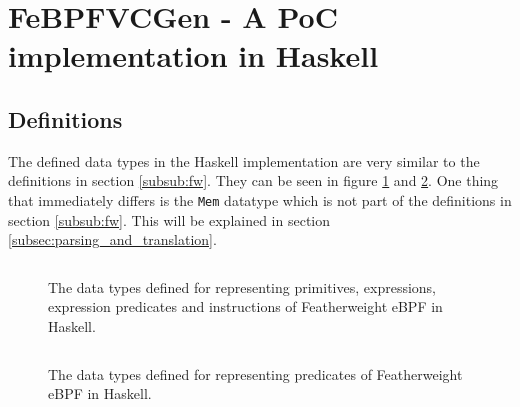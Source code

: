 \section{FeBPFVCGen - A PoC implementation in Haskell}
\label{sec:implementation}



\subsection{Definitions}
\label{subsec:definitions}

The defined data types in the Haskell implementation are very similar to the definitions in section \ref{subsub:fw}. They can be seen in figure \ref{snip:def1} and \ref{snip:def2}.
One thing that immediately differs is the \texttt{Mem} datatype which is not part of the definitions in section \ref{subsub:fw}. This will be explained in section \ref{subsec:parsing_and_translation}. 

\begin{figure}[ht]
  \centering
\inputminted[linenos]{haskell}{snippets/def1.hs}
  \caption{The data types defined for representing primitives, expressions, expression predicates and instructions of Featherweight eBPF in Haskell.}
  \label{snip:def1}
\end{figure}

\begin{figure}[ht]
  \centering
\inputminted[linenos]{haskell}{snippets/def2.hs}
  \caption{The data types defined for representing predicates of Featherweight eBPF in Haskell.}
  \label{snip:def2}
\end{figure}

